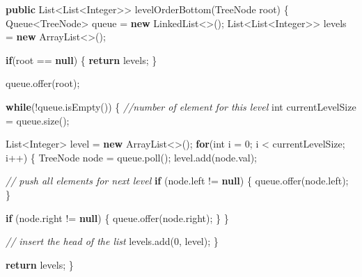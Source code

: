 \documentclass[]{book}
\newenvironment{Shaded}{\begin{snugshade}}{\end{snugshade}}
\newcommand{\BuiltInTok}[1]{#1}
\newcommand{\CommentTok}[1]{\textcolor[rgb]{0.56,0.35,0.01}{\textit{#1}}}
\newcommand{\DataTypeTok}[1]{\textcolor[rgb]{0.13,0.29,0.53}{#1}}
\newcommand{\DecValTok}[1]{\textcolor[rgb]{0.00,0.00,0.81}{#1}}
\newcommand{\FunctionTok}[1]{\textcolor[rgb]{0.00,0.00,0.00}{#1}}
\newcommand{\KeywordTok}[1]{\textcolor[rgb]{0.13,0.29,0.53}{\textbf{#1}}}
\newcommand{\NormalTok}[1]{#1}
\begin{document}
\begin{Shaded}
\begin{Highlighting}[]
\KeywordTok{public} \BuiltInTok{List}\NormalTok{<}\BuiltInTok{List}\NormalTok{<}\BuiltInTok{Integer}\NormalTok{>> }\FunctionTok{levelOrderBottom}\NormalTok{(}\BuiltInTok{TreeNode}\NormalTok{ root) \{}
    \BuiltInTok{Queue}\NormalTok{<}\BuiltInTok{TreeNode}\NormalTok{> queue = }\KeywordTok{new} \BuiltInTok{LinkedList}\NormalTok{<>();}
    \BuiltInTok{List}\NormalTok{<}\BuiltInTok{List}\NormalTok{<}\BuiltInTok{Integer}\NormalTok{>> levels = }\KeywordTok{new} \BuiltInTok{ArrayList}\NormalTok{<>();}

    \KeywordTok{if}\NormalTok{(root == }\KeywordTok{null}\NormalTok{) \{}
        \KeywordTok{return}\NormalTok{ levels;}
\NormalTok{    \}}

\NormalTok{    queue.}\FunctionTok{offer}\NormalTok{(root);}

    \KeywordTok{while}\NormalTok{(!queue.}\FunctionTok{isEmpty}\NormalTok{()) \{}
        \CommentTok{//number of element for this level}
        \DataTypeTok{int}\NormalTok{ currentLevelSize = queue.}\FunctionTok{size}\NormalTok{();}

        \BuiltInTok{List}\NormalTok{<}\BuiltInTok{Integer}\NormalTok{> level = }\KeywordTok{new} \BuiltInTok{ArrayList}\NormalTok{<>();}
        \KeywordTok{for}\NormalTok{(}\DataTypeTok{int}\NormalTok{ i = }\DecValTok{0}\NormalTok{; i < currentLevelSize; i++) \{}
            \BuiltInTok{TreeNode}\NormalTok{ node = queue.}\FunctionTok{poll}\NormalTok{();}
\NormalTok{            level.}\FunctionTok{add}\NormalTok{(node.}\FunctionTok{val}\NormalTok{);}

            \CommentTok{// push all elements for next level}
            \KeywordTok{if}\NormalTok{ (node.}\FunctionTok{left}\NormalTok{ != }\KeywordTok{null}\NormalTok{) \{}
\NormalTok{                queue.}\FunctionTok{offer}\NormalTok{(node.}\FunctionTok{left}\NormalTok{);}
\NormalTok{            \}}

            \KeywordTok{if}\NormalTok{ (node.}\FunctionTok{right}\NormalTok{ != }\KeywordTok{null}\NormalTok{) \{}
\NormalTok{                queue.}\FunctionTok{offer}\NormalTok{(node.}\FunctionTok{right}\NormalTok{);}
\NormalTok{            \}}
\NormalTok{        \}}

        \CommentTok{// insert the head of the list}
\NormalTok{        levels.}\FunctionTok{add}\NormalTok{(}\DecValTok{0}\NormalTok{, level);}
\NormalTok{    \}}

    \KeywordTok{return}\NormalTok{ levels;}
\NormalTok{\}}
\end{Highlighting}
\end{Shaded}
\end{document}
